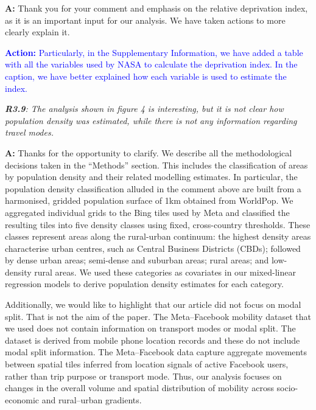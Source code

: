 \documentclass[12pt,a4paper,oneside, reqno]{amsart}
\begin{document}
\setlength{\leftskip}{1cm}\textbf{A:}  Thank you for your comment and emphasis on the relative deprivation index, as it is an important input for our analysis. We have taken actions to more clearly explain it. 

\textcolor{blue}{\textbf{Action:} Particularly, in the Supplementary Information, we have added a table with all the variables used by NASA to calculate the deprivation index. In the caption, we have better explained how each variable is used to estimate the index.}

\setlength{\leftskip}{0cm} \textit{\textbf{R3.9}: The analysis shown in figure 4 is interesting, but it is not clear how population density was estimated, while there is not any information regarding travel modes.}

\setlength{\leftskip}{1cm}\textbf{A:} Thanks for the opportunity to clarify. We describe all the methodological decisions taken in the ``Methods'' section. This includes the classification of areas by population density and their related modelling estimates. In particular, the population density classification alluded in the comment above are built from a harmonised, gridded population surface of 1km obtained from WorldPop. We aggregated individual grids to the Bing tiles used by Meta and classified the resulting tiles into five density classes using fixed, cross-country thresholds. These classes represent areas along the rural-urban continuum: the highest density areas characterise urban centres, such as Central Business Districts (CBDs); followed by dense urban areas; semi-dense and suburban areas; rural areas; and low-density rural areas. We used these categories as covariates in our mixed-linear regression models to derive population density estimates for each category.

Additionally, we would like to highlight that our article did not focus on modal split. That is not the aim of the paper. The Meta–Facebook mobility dataset that we used does not contain information on transport modes or modal split. The dataset is derived from mobile phone location records and these do not include modal split information. The Meta–Facebook data capture aggregate movements between spatial tiles inferred from location signals of active Facebook users, rather than trip purpose or transport mode. Thus, our analysis focuses on changes in the overall volume and spatial distribution of mobility across socio-economic and rural–urban gradients.
\end{document}
